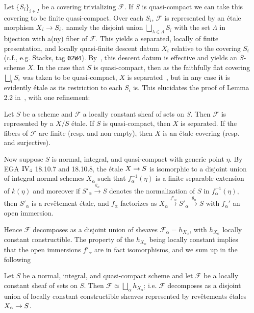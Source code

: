 \documentclass[deligne.tex]{subfiles}
\begin{document}
Let $\{S_i\}_{i\in I}$ be a covering trivializing $\mathscr F$. If $S$ is
quasi-compact we can take this covering to be finite quasi-compact.
Over each $S_i$, $\mathscr F$ is represented by an étale morphism
$X_i\rightarrow S_i$, namely the disjoint union $\bigsqcup_{\lambda\in\Lambda} S_i$ 
with the set $\Lambda$ in bijection with a(ny) fiber of $\mathscr F$.
This yields a separated, locally of finite presentation, and
locally quasi-finite descent datum $X_i$ relative to the covering $S_i$
(c.f., e.g. Stacks, tag
\texttt{\href{https://stacks.math.columbia.edu/tag/02W4}{02W4}}).
By~\cite[Exp. X, 5.4]{SGA3}, this descent datum is effective and yields
an $S$-scheme $X$. In the case that $S$ is quasi-compact, then as the
faithfully flat covering $\bigsqcup_i S_i$ was taken to be 
quasi-compact, $X$ is separated~\cite[Exp. VIII, 4.8 or Exp. IX, 2.4]{SGA1}, 
but in any case it is evidently étale as its restriction to each $S_i$ is.
This elucidates the proof of Lemma 2.2 in~\cite[Exp. IX]{SGAA}, with one 
refinement:
\begin{lemma*}
	Let $S$ be a scheme and $\mathscr F$ a locally constant sheaf of sets on
	$S$. Then $\mathscr F$ is represented by a $X/S$ étale.
	If $S$ is quasi-compact, then $X$ is separated.
	If the fibers of $\mathscr F$ are finite (resp. and non-empty), then
	$X$ is an étale covering (resp. and surjective).
\end{lemma*}
Now suppose $S$ is normal, integral, and quasi-compact with generic point
$\eta$.
By EGA $\text{IV}_{\text 4}$ 18.10.7 and 18.10.8, the étale $X\rightarrow S$
is isomorphic to a disjoint union of integral normal schemes $X_\alpha$
such that $f_\alpha^{-1}(\eta)$ is a finite separable extension of
$k(\eta)$ and moreover if $S'_\alpha\xrightarrow{g_\alpha}S$ denotes the
normalization of $S$ in $f_\alpha^{-1}(\eta)$, then $S'_\alpha$ is a 
revêtement étale, and $f_\alpha$ factorizes as
$X_\alpha\xrightarrow{f'_\alpha}S'_\alpha\xrightarrow{g_\alpha}S$
with $f_\alpha'$ an open immersion.

Hence $\mathscr F$ decomposes as a disjoint union of sheaves
$\mathscr F_\alpha=h_{X_\alpha}$, with $h_{X_\alpha}$ locally constant
constructible. The property of the $h_{X_\alpha}$ being locally constant
implies that the open immersions $f'_\alpha$ are in fact isomorphisms, and
we sum up in the following
\begin{lemma*}
	Let $S$ be a normal, integral, and quasi-compact scheme and let
	$\mathscr F$ be a locally constant sheaf of sets on $S$.
	Then $\mathscr F\simeq\bigsqcup_\alpha h_{X_\alpha}$; i.e. $\mathscr F$
	decomposes as a disjoint union of locally constant constructible sheaves
	represented by revêtements étales $X_\alpha\rightarrow S$.
\end{lemma*}
\end{document}

